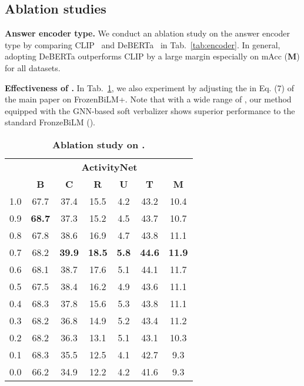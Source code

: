 \documentclass[10pt,twocolumn,letterpaper]{article}
\begin{document}
\subsection{Ablation studies}

\noindent \textbf{Answer encoder type.}
We conduct an ablation study on the answer encoder type by comparing CLIP~\cite{radford2021learning} and DeBERTa~\cite{he2020deberta} in Tab.~\ref{tab:encoder}.
In general, adopting DeBERTa outperforms CLIP by a large margin especially on mAcc (\textbf{M}) for all datasets.

\noindent \textbf{Effectiveness of .}
In Tab.~\ref{tab:epsilon}, we also experiment by adjusting the  in Eq. (7) of the main paper on FrozenBiLM+.
Note that with a wide range of , our method equipped with the GNN-based soft verbalizer shows superior performance to the standard FronzeBiLM (). \begin{table}[t!]
    \centering
    \setlength{\tabcolsep}{3.5pt}
    \begin{tabular}{c|c c c c c >{\columncolor{lightgray}}c}
        \toprule
         & \multicolumn{6}{c}{\textbf{ActivityNet}} \\
        & \textbf{B} & \textbf{C} & \textbf{R} & \textbf{U} & \textbf{T} & \textbf{M} \\
        \midrule
        \midrule
        1.0 & 67.7 & 37.4 & 15.5 & 4.2 & 43.2 & 10.4 \\
        0.9 & \textbf{68.7} & 37.3 & 15.2 & 4.5 & 43.7 & 10.7 \\
        0.8 & 67.8 & 38.6 & 16.9 & 4.7 & 43.8 & 11.1 \\
        0.7 & 68.2 & \textbf{39.9} & \textbf{18.5} & \textbf{5.8} & \textbf{44.6} & \textbf{11.9} \\
        0.6 & 68.1 & 38.7 & 17.6 & 5.1 & 44.1 & 11.7 \\
        0.5 & 67.5 & 38.4 & 16.2 & 4.9 & 43.6 & 11.1 \\
        0.4 & 68.3 & 37.8 & 15.6 & 5.3 & 43.8 & 11.1 \\
        0.3 & 68.2 & 36.8 & 14.9 & 5.2 & 43.4 & 11.2 \\
        0.2 & 68.2 & 36.3 & 13.1 & 5.1 & 43.1 & 10.3 \\
        0.1 & 68.3 & 35.5 & 12.5 & 4.1 & 42.7 & 9.3 \\
        0.0 & 66.2 & 34.9 & 12.2 & 4.2 & 41.6 & 9.3 \\
        \bottomrule
    \end{tabular}
    \caption{\textbf{Ablation study on .}
    }
    \label{tab:epsilon}

\end{table}
\end{document}
